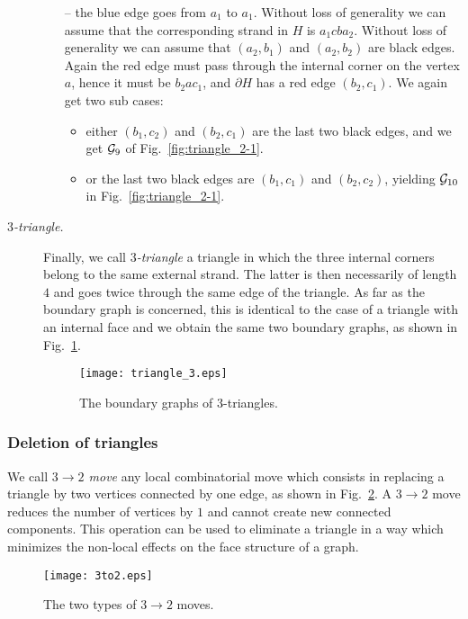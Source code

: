 \documentclass[10pt]{article}
\theoremstyle{plain}
\theoremstyle{definition}
\newcommand{\cG}{{\cal G}}
\begin{document}
\begin{description}
\begin{itemize}
\begin{itemize}
 \end{itemize}
 \item[--] the blue edge goes from $a_1$ to $a_1$.  Without loss of generality we can assume that the corresponding strand in $H$ is $a_1cba_2$. 
 Without loss of generality we can assume that $(a_2,b_1)$ and $(a_2,b_2)$ are black edges. Again the red edge must pass through the internal corner on the vertex $a$,
 hence it must be $b_2 a c_1$, and $\partial H$ has a red edge $(b_2,c_1)$. We again get two sub cases:
   \begin{itemize}
     \item either $(b_1, c_2)$ and $(b_2, c_1)$ are the last two black edges, and we get $\cG_9$ of Fig.~\ref{fig:triangle_2-1}.
     \item or the last two black edges are $(b_1, c_1)$ and $(b_2, c_2)$, yielding $\cG_{10}$ in Fig.~\ref{fig:triangle_2-1}.
   \end{itemize}

\end{itemize}
 
\item[\it $3$-triangle.]
Finally, we call \emph{$3$-triangle} a triangle in which the three internal corners belong to the same external strand. 
The latter is then necessarily of length $4$ and goes twice through the same edge of the triangle. As far as the boundary graph is concerned, this is 
identical to the case of a triangle with an internal face and we obtain the same two boundary graphs, as shown in Fig.~\ref{fig:triangle_3}.
\begin{figure}[htb]
 \begin{center}
 \texttt{[image: triangle\_3.eps]}  
 \caption{The boundary graphs of $3$-triangles.} \label{fig:triangle_3}
 \end{center}
 \end{figure}



 \end{description}

\subsubsection{Deletion of triangles}

We call \emph{$3 \to 2$ move} any local combinatorial move which consists in replacing a triangle by two vertices connected by one edge, as shown in Fig.~\ref{fig:3to2}. A $3 \to 2$ move reduces the number of vertices by $1$ 
and cannot create new connected components. This operation can be used to eliminate a triangle in a way which minimizes the non-local effects on the face structure of a graph.  
\begin{figure}[htb]
 \begin{center}
 \texttt{[image: 3to2.eps]}  
 \caption{The two types of $3\to2$ moves.} \label{fig:3to2}
 \end{center}
 \end{figure}
\end{document}
